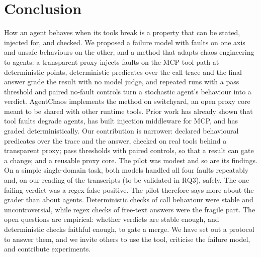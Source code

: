 \section{Conclusion}\label{sec:conclusion}

How an agent behaves when its tools break is a property that can be stated, injected for, and checked. We proposed a failure model with faults on one axis and unsafe behaviours on the other, and a method that adapts chaos engineering to agents: a transparent proxy injects faults on the MCP tool path at deterministic points, deterministic predicates over the call trace and the final answer grade the result with no model judge, and repeated runs with a pass threshold and paired no-fault controls turn a stochastic agent's behaviour into a verdict. AgentChaos implements the method on switchyard, an open proxy core meant to be shared with other runtime tools. Prior work has already shown that tool faults degrade agents, has built injection middleware for MCP, and has graded deterministically. Our contribution is narrower: declared behavioural predicates over the trace and the answer, checked on real tools behind a transparent proxy; pass thresholds with paired controls, so that a result can gate a change; and a reusable proxy core.
The pilot was modest and so are its findings. On a simple single-domain task, both models handled all four faults repeatably and, on our reading of the transcripts (to be validated in RQ3), safely. The one failing verdict was a regex false positive. The pilot therefore says more about the grader than about agents. Deterministic checks of call behaviour were stable and uncontroversial, while regex checks of free-text answers were the fragile part.
The open questions are empirical: whether verdicts are stable enough, and deterministic checks faithful enough, to gate a merge. We have set out a protocol to answer them, and we invite others to use the tool, criticise the failure model, and contribute experiments.
